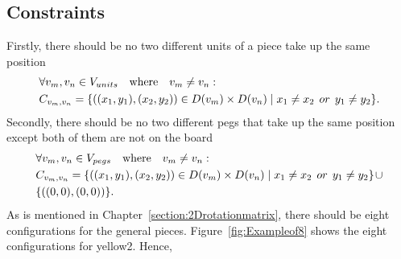 \subsection{Constraints}
\label{section:IQtwistconstriant}
Firstly, there should be no two different units of a piece take up the same position
\begin{equation}
\label{equ:firstconstrain}
\begin{aligned}
&\forall v_{m},v_{n} \in \VUnits\quad \text{where} \quad v_{m} \neq v_{n}:\\
&\Constraints{m}{n}=\{((x_{1},y_{1}),(x_{2},y_{2}))\in \Domain{m} \times \Domain{n}\mid x_{1} \neq x_{2}   \hspace{1ex} or \hspace{1ex}  y_{1} \neq y_{2}\}.
\end{aligned}
\end{equation}
Secondly, there should be no two different pegs that take up the same position except both of them are not on the board
\begin{equation}
\label{equ:secondconstrain}
\begin{aligned}
&\forall v_{m},v_{n}\in \VPegs \quad \text{where} \quad v_{m} \neq v_{n}:\\
&\Constraints{m}{n}=\{((x_{1},y_{1}),(x_{2},y_{2}))\in \Domain{m}\times \Domain{n}\mid x_{1} \neq x_{2}   \hspace{1ex} or \hspace{1ex}  y_{1} \neq y_{2}\}\hspace{1pt}\cup \\
&\{((0,0),(0,0))\}.
\end{aligned}
\end{equation}
As is mentioned in Chapter~\ref{section:2Drotationmatrix}, there should be eight configurations for the general pieces. Figure~\ref{fig:Exampleof8} shows the eight configurations for yellow2. Hence,
